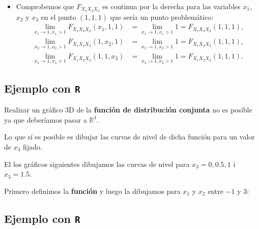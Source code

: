 \documentclass[]{book}
\providecommand{\tightlist}{%
  \setlength{\itemsep}{0pt}\setlength{\parskip}{0pt}}
\begin{document}
\begin{itemize}
\tightlist
\item
  Comprobemos que \(F_{X_1X_2X_3}\) es continua por la derecha para las variables \(x_1\), \(x_2\) y \(x_3\) en el punto \((1,1,1)\) que sería un punto problemático:
  \[
  \begin{array}{rl}
   \lim_{x_1\to 1,x_1> 1} F_{X_1X_2X_3}(x_1,1,1) & =\lim_{x_1\to 1,x_1> 1} 1  = F_{X_1X_2X_3}(1,1,1),\\
   \lim_{x_2\to 1,x_2> 1} F_{X_1X_2X_3}(1,x_2,1) & =\lim_{x_2\to 1,x_2> 1} 1 = F_{X_1X_2X_3}(1,1,1),\\  
  \lim_{x_3\to 1,x_3> 1} F_{X_1X_2X_3}(1,1,x_3) & =\lim_{x_3\to 1,x_3> 1} 1  = F_{X_1X_2X_3}(1,1,1).
  \end{array}
  \]
\end{itemize}

\hypertarget{ejemplo-con-r-9}{%
\subsection{\texorpdfstring{Ejemplo con \texttt{R}}{Ejemplo con R}}\label{ejemplo-con-r-9}}

Realizar un gráfico 3D de la \textbf{función de distribución conjunta} no es posible ya que deberíamos pasar a \(\mathbb{R}^4\).

Lo que sí es posible es dibujar las curvas de nivel de dicha función para un valor de \(x_3\) fijado.

El los gráficos siguientes dibujamos las curvas de nivel para \(x_3=0,0.5,1\) i \(x_3=1.5\).

Primero definimos la \textbf{función} y luego la dibujamos para \(x_1\) y \(x_2\) entre \(-1\) y \(3\):

\hypertarget{ejemplo-con-r-10}{%
\subsection{\texorpdfstring{Ejemplo con \texttt{R}}{Ejemplo con R}}\label{ejemplo-con-r-10}}
\end{document}
